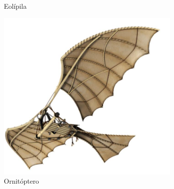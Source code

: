 \begin{figure}[ht!]
\begin{minipage}{0.3\linewidth}
		\caption*{\centering Eolípila \cite{giri2020maquinas}}
	\end{minipage}
	\hspace{3cm}
	\begin{minipage}{0.3\linewidth}
		\centering
		\includegraphics[width=\linewidth]{figs/davinci.png}
		\caption*{\centering Ornitóptero \cite{velazquezcual}}
	\end{minipage}
	\hspace{3cm}
	\begin{minipage}{0.3\linewidth}
		\centering

\end{minipage}
\end{figure}
